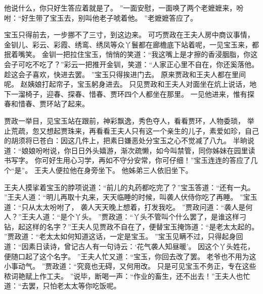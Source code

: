 他说什么，你只好生答应着就是了。
”一面安慰，一面唤了两个老嬷嬷来，吩咐：“好生带了宝玉去，别叫他老子唬着他。
”老嬷嬷答应了。
\par
宝玉只得前去，一步挪不了三寸，\ceng {}到这边来。
可巧贾政在王夫人房中商议事情，金钏儿、彩云、彩霞、绣鸾、绣凤等众丫鬟都在廊檐底下站着呢，一见宝玉来，都抿着嘴笑。
金钏一把拉住宝玉，悄悄的笑道：“我这嘴上是才擦的香浸胭脂，你这会子可吃不吃了？”彩云一把推开金钏，笑道：“人家正心里不自在，你还奚落他。
趁这会子喜欢，快进去罢。
”宝玉只得挨进门去。
原来贾政和王夫人都在里间呢。
赵姨娘打起帘子，宝玉躬身进去。
只见贾政和王夫人对面坐在炕上说话，地下一溜椅子，迎春、探春、惜春、贾环四个人都坐在那里。
一见他进来，惟有探春和惜春、贾环站了起来。
\par
贾政一举目，见宝玉站在跟前，神彩飘逸，秀色夺人，看看贾环，人物委琐，
举止荒疏，忽又想起贾珠来，再看看王夫人只有这一个亲生的儿子，素爱如珍，自己的胡须将已苍白：因这几件上，把素日嫌恶处分宝玉之心不觉减了八九。
半晌说道：“娘娘吩咐说，你日日外头嬉游，渐次疏懒，如今叫禁管，同你姊妹在园里读书写字。
你可好生用心习学，再如不守分安常，你可仔细！”宝玉连连的答应了几个“是”。
王夫人便拉他在身旁坐下。
他姊弟三人依旧坐下。
\par
王夫人摸挲着宝玉的脖项说道：“前儿的丸药都吃完了？”宝玉答道：“还有一丸。
”王夫人道：“明儿再取十丸来，天天临睡的时候，叫袭人伏侍你吃了再睡。
”宝玉道：“只从太太吩咐了，
袭人天天晚上想着，打发我吃。
”贾政问道：“袭人是何人？”王夫人道：“是个丫头。
”贾政道：“丫头不管叫个什么罢了，是谁这样刁钻，起这样的名字？”王夫人见贾政不自在了，便替宝玉掩饰道：“是老太太起的。
”贾政道：“老太太如何知道这话，一定是宝玉。
”宝玉见瞒不过，只得起身回道：“因素日读诗，曾记古人有一句诗云：‘花气袭人知昼暖’。
因这个丫头姓花，便随口起了这个名字。
”王夫人忙又道：“宝玉，你回去改了罢。
老爷也不用为这小事动气。
”贾政道：“究竟也无碍，又何用改。
只是可见宝玉不务正，专在这些秾词艳赋上作工夫。
”说毕，断喝一声：“作业的畜生，还不出去！”王夫人也忙道：“去罢，只怕老太太等你吃饭呢。
